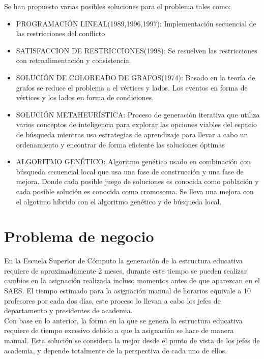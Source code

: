 		Se han propuesto varias posibles soluciones para el problema tales como:
		
		\begin{itemize}
			
			\item PROGRAMACIÓN LINEAL(1989,1996,1997): Implementación secuencial de las restricciones del conflicto
			
			\item SATISFACCION DE RESTRICCIONES(1998): Se resuelven las restricciones con retroalimentación y consistencia.
			
			\item SOLUCIÓN DE COLOREADO DE GRAFOS(1974): Basado en la teoría de grafos se reduce el problema a el vértices y lados. Los eventos en forma de vértices y los lados en forma de condiciones.
			
			\item SOLUCIÓN METAHEURÍSTICA: Proceso de generación iterativa que utiliza varios conceptos de inteligencia para explorar las opciones viables del espacio de búsqueda mientras usa estrategias de aprendizaje para llevar a cabo un ordenamiento y encontrar de forma eficiente las soluciones óptimas
			
			\item ALGORITMO GENÉTICO: Algoritmo genético usado en combinación con búsqueda secuencial local que usa una fase de construcción y una fase de mejora. Donde cada posible juego de soluciones es conocida como población y cada posible solución es conocida como cromosoma. Se lleva una mejora con el algotimo híbrido con el algoritmo genético y de búsqueda local.
		\end{itemize}


\section{Problema de negocio}
	En la Escuela Superior de Cómputo la generación de la estructura educativa requiere de aproximadamente 2 meses, durante este tiempo se pueden realizar cambios en la asignación realizada incluso momentos antes de que aparezcan en el SAES. El tiempo estimado para la asignación manual de horarios equivale a 10 profesores por cada dos días, este proceso lo llevan a cabo los jefes de departamento y presidentes de academia. \\
	
	Con base en lo anterior, la forma en la que se genera la estructura educativa requiere de tiempo excesivo debido a que la asignación se hace de manera manual. Esta solución se considera la mejor desde el punto de vista de los jefes de academia, y depende totalmente de la perspectiva de cada uno de ellos.

